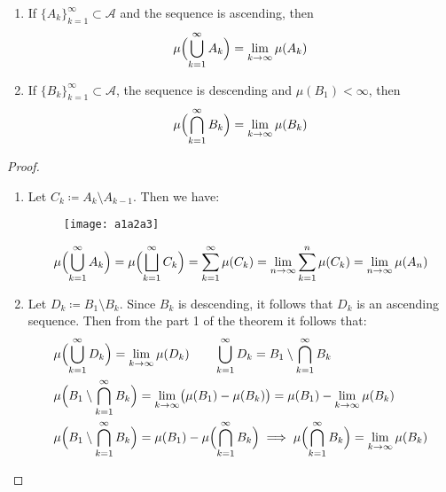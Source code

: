 \begin{theorem}
    \label{the:continuityOfMeasure}
    \item{} %
    \begin{enumerate}
        \item {
            If $\{A_k\}_{k=1}^\infty \subset \mathcal{A}$ and the sequence is ascending,
            then
            \[
                \mu\Bigl(\bigcup_{k=1}^\infty A_k\Bigr) = \lim_{k \to \infty} \mu(A_k)
            \]
        }
        \item {
            If $\{B_k\}_{k=1}^\infty \subset \mathcal{A}$, the sequence is descending and $\mu(B_1) < \infty$,
            then
            \[
                \mu\Bigl(\bigcap_{k=1}^\infty B_k\Bigr) = \lim_{k \to \infty} \mu(B_k)
            \]
        }
    \end{enumerate}
\end{theorem}
\begin{proof}
    \begin{enumerate}
        \item {
            Let $C_k \coloneqq A_k \setminus A_{k-1}$. Then we have:

            \begin{figure*}[h]
                \centering
                \texttt{[image: a1a2a3]}
            \end{figure*}

            \[
                \mu\Bigl(\bigcup_{k=1}^\infty A_k\Bigr) =
                \mu\Bigl(\bigsqcup_{k=1}^\infty C_k\Bigr) =
                \sum_{k=1}^\infty \mu(C_k) =
                \lim_{n \to \infty} \sum_{k=1}^n \mu(C_k) = \lim_{n \to \infty} \mu(A_n)
            \]
        }
        \item {
            Let $D_k \coloneqq B_1 \setminus B_k$. 
            Since $B_k$ is descending, it follows that $D_k$ is an ascending sequence. Then from the part 1 of the theorem it follows that:
            \begin{align*}
                &
                \mu\Bigl(\bigcup_{k=1}^\infty D_k\Bigr) = \lim_{k \to \infty} \mu(D_k)
                \qquad
                \bigcup_{k=1}^\infty D_k = B_1 \setminus \bigcap_{k=1}^\infty B_k
                \\&
                \mu\Bigl(B_1 \setminus \bigcap_{k=1}^\infty B_k\Bigr) =
                \lim_{k \to \infty}\bigl(\mu(B_1) - \mu(B_k)\bigr) =
                \mu(B_1) - \lim_{k \to \infty} \mu(B_k)
                \\&
                \mu\Bigl(B_1 \setminus \bigcap_{k=1}^\infty B_k\Bigr) =
                \mu(B_1) - \mu\Bigl(\bigcap_{k=1}^\infty B_k\Bigr) \implies
                \mu\Bigl(\bigcap_{k=1}^\infty B_k\Bigr) = \lim_{k \to \infty} \mu(B_k)
            \end{align*}
        }
    \end{enumerate}    
\end{proof}

